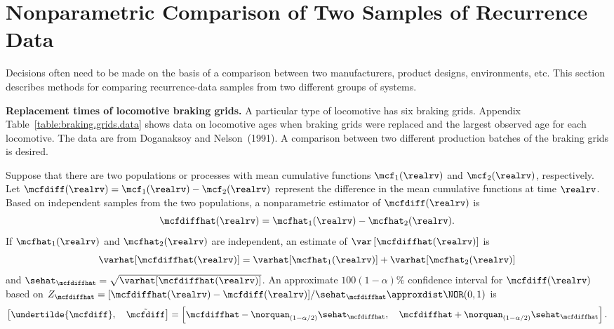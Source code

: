 \section{Nonparametric Comparison of
Two Samples of Recurrence Data}
\label{section:nonpar.two.samp.mcf}
Decisions often need to be made on the basis of a comparison between
two manufacturers, product designs, environments, etc. This section describes
methods for comparing recurrence-data
samples from two different groups of systems.

\begin{example}
\label{example:braking.grid.data}
{\bf Replacement times of locomotive braking grids.} A particular
type of locomotive has six braking grids.  Appendix
Table~\ref{table:braking.grids.data} shows data on locomotive ages when
braking grids were replaced and the largest observed age for each
locomotive.  The data are from Doganaksoy and Nelson~(1991).  A
comparison between two different production batches of the braking
grids is desired.
\end{example}

Suppose that there are two populations or processes with mean
cumulative functions $\mcf_{1}(\realrv)$ and $\mcf_{2}(\realrv)$,
respectively.  Let $\mcfdiff(\realrv)=\mcf_{1}(\realrv)-\mcf_{2}(\realrv)$ 
represent the difference in the
mean cumulative functions at time $\realrv$. Based on independent
samples from the two populations, a nonparametric estimator of
$\mcfdiff(\realrv)$ is
\begin{displaymath}
\mcfdiffhat(\realrv)=\mcfhat_{1}(\realrv)-\mcfhat_{2}(\realrv).
\end{displaymath}
If $\mcfhat_{1}(\realrv)$ and $\mcfhat_{2}(\realrv)$ are independent,
an estimate of $\var \left[\mcfdiffhat(\realrv)\right]$ is
\begin{displaymath}
\varhat[\mcfdiffhat(\realrv)]=
\varhat[\mcfhat_{1}(\realrv)]+
\varhat[\mcfhat_{2}(\realrv)]
\end{displaymath}
and $\sehat_{\mcfdiffhat} =\sqrt{\varhat[\mcfdiffhat(\realrv)]}$.
An approximate $100(1-\alpha)\%$ confidence interval for  
$\mcfdiff(\realrv)$ based on $Z_{\mcfdiffhat} =
[\mcfdiffhat(\realrv) - \mcfdiff(\realrv)]/\sehat_{\mcfdiffhat} 
\approxdist \NOR(0,1)$ is
\begin{displaymath}
\left [ 
\undertilde{\mcfdiff}, \quad
 \tilde{\mcfdiff}
\right ]=
\left [
\mcfdiffhat - \norquan_{(1-\alpha/2)} \sehat_{\mcfdiffhat},
\quad
\mcfdiffhat + \norquan_{(1-\alpha/2)} \sehat_{\mcfdiffhat}
\right ].
\end{displaymath}


